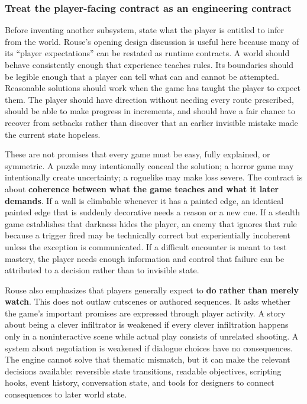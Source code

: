 \subsubsection{Treat the player-facing contract as an engineering contract}\label{05-engine-i-ch009-treat-the-player-facing-contract-as-an-engineering-contract}

\hypertarget{05-engine-i-ch009-treat-the-player-facing-contract-as-an-engineering-contract}{}

Before inventing another subsystem, state what the player is entitled to infer from the world. Rouse's opening design discussion is useful here because many of its ``player expectations'' can be restated as runtime contracts. A world should behave consistently enough that experience teaches rules. Its boundaries should be legible enough that a player can tell what can and cannot be attempted. Reasonable solutions should work when the game has taught the player to expect them. The player should have direction without needing every route prescribed, should be able to make progress in increments, and should have a fair chance to recover from setbacks rather than discover that an earlier invisible mistake made the current state hopeless.

These are not promises that every game must be easy, fully explained, or symmetric. A puzzle may intentionally conceal the solution; a horror game may intentionally create uncertainty; a roguelike may make loss severe. The contract is about \textbf{coherence between what the game teaches and what it later demands}. If a wall is climbable whenever it has a painted edge, an identical painted edge that is suddenly decorative needs a reason or a new cue. If a stealth game establishes that darkness hides the player, an enemy that ignores that rule because a trigger fired may be technically correct but experientially incoherent unless the exception is communicated. If a difficult encounter is meant to test mastery, the player needs enough information and control that failure can be attributed to a decision rather than to invisible state.

Rouse also emphasizes that players generally expect to \textbf{do rather than merely watch}. This does not outlaw cutscenes or authored sequences. It asks whether the game's important promises are expressed through player activity. A story about being a clever infiltrator is weakened if every clever infiltration happens only in a noninteractive scene while actual play consists of unrelated shooting. A system about negotiation is weakened if dialogue choices have no consequences. The engine cannot solve that thematic mismatch, but it can make the relevant decisions available: reversible state transitions, readable objectives, scripting hooks, event history, conversation state, and tools for designers to connect consequences to later world state.

